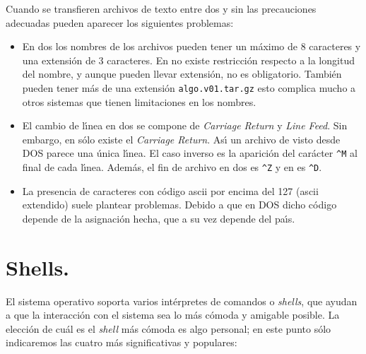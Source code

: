 Cuando se transfieren archivos de texto entre {\sc dos} y {\unix} sin las
precauciones adecuadas pueden aparecer los siguientes problemas:

\begin{itemize}
\item En {\sc dos} los nombres de los archivos pueden tener un m{\'a}ximo
  de 8 caracteres y una extensi{\'o}n de 3 caracteres. En {\unix} no
  existe restricci{\'o}n respecto a la longitud del nombre, y aunque
  pueden llevar extensi{\'o}n, no es obligatorio. Tambi{\'e}n pueden tener m{\'a}s
  de una extensi{\'o}n \verb+algo.v01.tar.gz+ esto complica mucho a otros
  sistemas que tienen limitaciones en los nombres.
  
\item El cambio de l{\'\i}nea en {\sc dos} se compone de {\it Carriage
    Return} y {\it Line Feed}. Sin embargo, en {\unix} s{\'o}lo existe el
  {\it Carriage Return}. As{\'\i} un archivo de {\unix} visto desde DOS parece una
  {\'u}nica l{\'\i}nea. El caso inverso es la aparici{\'o}n del car{\'a}cter \verb+^M+ al
  final de cada l{\'\i}nea. Adem{\'a}s, el fin de archivo en {\sc dos} es
  \verb+^Z+ y en {\unix} es \verb+^D+.
  
\item La presencia de caracteres con c{\'o}digo {\sc ascii} por encima del
  127 ({\sc ascii} extendido) suele plantear problemas. Debido a que
  en DOS dicho c{\'o}digo depende de la asignaci{\'o}n hecha, que a su vez
  depende del pa{\'\i}s.

\end{itemize}



\section{Shells.}

El sistema operativo {\unix} soporta varios int{\'e}rpretes de comandos o
{\it shells}, que ayudan a que la interacci{\'o}n con el sistema sea lo m{\'a}s
c{\'o}moda y amigable posible. La elecci{\'o}n de cu{\'a}l es el {\it shell} m{\'a}s c{\'o}moda
es algo personal; en este punto s{\'o}lo indicaremos las cuatro m{\'a}s
significativas y populares:

